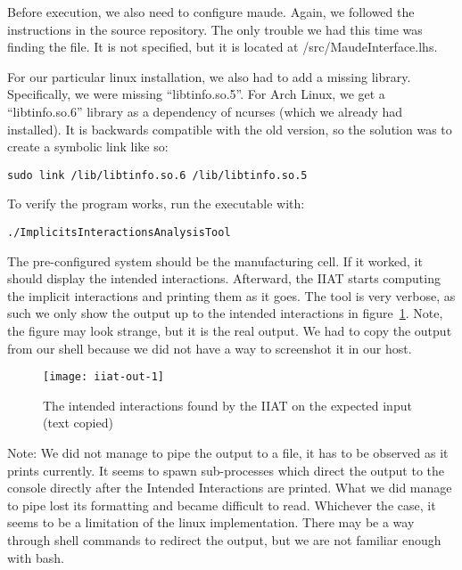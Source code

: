 Before execution, we also need to configure maude.
Again, we followed the instructions in the source repository.
The only trouble we had this time was finding the file.
It is not specified, but it is located at /src/MaudeInterface.lhs.

For our particular linux installation, we also had to add a missing library.
Specifically, we were missing ``libtinfo.so.5''.
For Arch Linux, we get a ``libtinfo.so.6'' library as a dependency of ncurses (which we already had installed).
It is backwards compatible with the old version, so the solution was to create a symbolic link like so:
\begin{verbatim}sudo link /lib/libtinfo.so.6 /lib/libtinfo.so.5\end{verbatim}

To verify the program works, run the executable with:
\begin{verbatim}./ImplicitsInteractionsAnalysisTool\end{verbatim}
The pre-configured system should be the manufacturing cell.
If it worked, it should display the intended interactions.
Afterward, the IIAT starts computing the implicit interactions and printing them as it goes.
The tool is very verbose, as such we only show the output up to the intended interactions in figure~\ref{fig:iiat-out}.
Note, the figure may look strange, but it is the real output.
We had to copy the output from our shell because we did not have a way to screenshot it in our host.
\begin{figure}[ht]
    \centering
    \texttt{[image: iiat-out-1]}
    \caption{The intended interactions found by the IIAT on the expected input (text copied)}
    \label{fig:iiat-out}
\end{figure}

Note: We did not manage to pipe the output to a file, it has to be observed as it prints currently.
It seems to spawn sub-processes which direct the output to the console directly after the Intended Interactions are printed.
What we did manage to pipe lost its formatting and became difficult to read.
Whichever the case, it seems to be a limitation of the linux implementation.
There may be a way through shell commands to redirect the output, but we are not familiar enough with bash.

